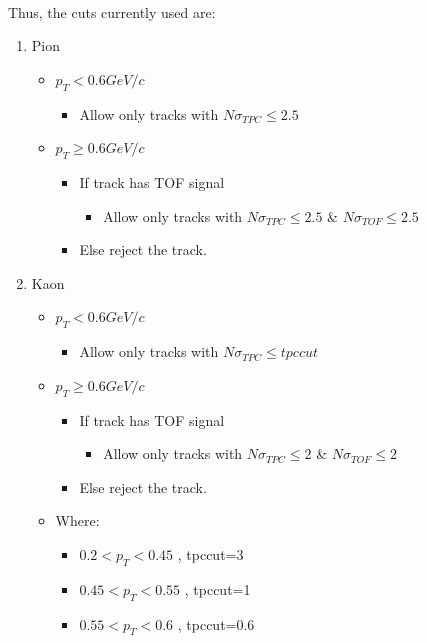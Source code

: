 \documentclass[ALICE,manyauthors]{ALICE_analysis_notes}
\begin{document}
\\
Thus, the cuts currently used are:
\begin{enumerate}
	\item Pion
	\begin{itemize}[label=@]
		\item $p_T<0.6GeV/c$
		\begin{itemize}[label=$\bullet$]
			\item Allow only tracks with $N\sigma_{TPC} \leq 2.5$
		\end{itemize}
		\item $p_T\geq 0.6GeV/c$
		\begin{itemize}[label=$\bullet$]
			\item If track has TOF signal
			\begin{itemize}[label=$\star$]
				\item Allow  only tracks with $N\sigma_{TPC} \leq 2.5$ \& $N\sigma_{TOF}\leq 2.5$
			\end{itemize}
			\item Else reject the track.
		\end{itemize}
	\end{itemize}
	\item Kaon
	\begin{itemize}[label=@]
		\item $p_T<0.6GeV/c$
		\begin{itemize}[label=$\bullet$]
			\item Allow only tracks with $N\sigma_{TPC} \leq tpccut$
		\end{itemize}
		\item $p_T\geq 0.6GeV/c$
		\begin{itemize}[label=$\bullet$]
			\item If track has TOF signal
			\begin{itemize}[label=$\star$]
				\item Allow  only tracks with $N\sigma_{TPC} \leq 2$ \& $N\sigma_{TOF}\leq 2$
			\end{itemize}
			\item Else reject the track.
		\end{itemize}
		\item Where:
		\begin{itemize}[label=]
			\item $0.2<p_T<0.45$ , tpccut=3
			\item $0.45<p_T<0.55$ , tpccut=1
			\item $0.55<p_T<0.6$ , tpccut=0.6
		\end{itemize}

\end{itemize}
\end{enumerate}
\end{document}
